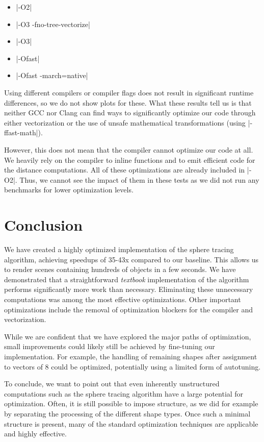 \documentclass[letterpaper]{article}
\begin{document}
\begin{itemize}
    \setlength{\itemsep}{0pt}
    \setlength{\parskip}{0pt}
    \setlength{\parsep}{0pt}
    \item |-O2|
    \item |-O3 -fno-tree-vectorize|
    \item |-O3|
    \item |-Ofast|
    \item |-Ofast -march=native|
\end{itemize}

Using different compilers or compiler flags does not result in significant runtime differences, so we do not show plots for these.
What these results tell us is that neither GCC nor Clang can find ways to 
significantly optimize our code through either vectorization or the use of unsafe
mathematical transformations (using |-ffast-math|).

However, this does not mean that the compiler cannot optimize our code at all. We heavily rely on the compiler to inline functions and to emit efficient code
for the distance computations. All of these optimizations are already included in |-O2|. Thus, we cannot see the impact of them in these tests as we did not run any
benchmarks for lower optimization levels.

\section{Conclusion}

We have created a highly optimized implementation of the sphere tracing algorithm, achieving speedups of 35-43x compared to our baseline. This allows us to render scenes containing hundreds of objects in a few seconds. We have demonstrated that a straightforward \emph{textbook} implementation of the algorithm performs significantly more work than necessary. Eliminating these unnecessary computations was among the most effective optimizations.
Other important optimizations include the removal of optimization blockers for the compiler and vectorization.

While we are confident that we have explored the major paths of optimization, small improvements could likely still be achieved by fine-tuning our implementation. For example, the handling of remaining shapes after assignment to vectors of 8 could be optimized, potentially using a limited form of autotuning.

To conclude, we want to point out that even inherently unstructured computations such as the sphere tracing algorithm have a large potential for optimization. Often, it is still possible to impose structure, as we did for example by separating the processing of the different shape types. Once such a minimal structure is present, many of the standard optimization techniques are applicable and highly effective.
\end{document}
